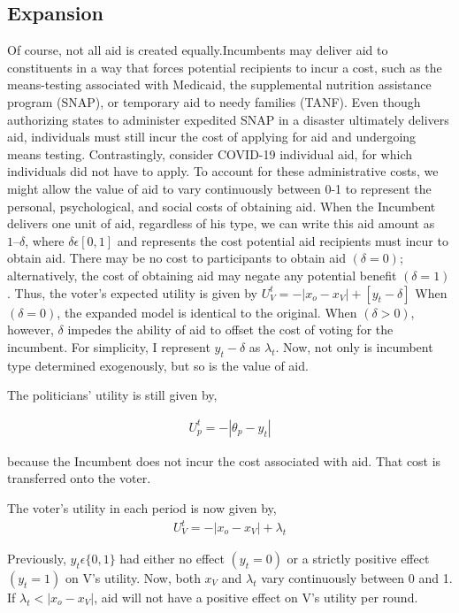 \documentclass[12pt]{paper}
\begin{document}
\subsection{Expansion}
Of course, not all aid is created equally.Incumbents may deliver aid to constituents in a way that forces potential recipients to incur a cost, such as the means-testing associated with Medicaid, the supplemental nutrition assistance program (SNAP), or temporary aid to needy families (TANF). Even though authorizing states to administer expedited SNAP in a disaster ultimately delivers aid, individuals must still incur the cost of applying for aid and undergoing means testing. Contrastingly, consider COVID-19 individual aid, for which individuals did not have to apply.
To account for these administrative costs, we might allow the value of aid to vary continuously between 0-1 to represent the personal, psychological, and social costs of obtaining aid. When the Incumbent delivers one unit of aid, regardless of his type, we can write this aid amount as $1 – \delta$, where $\delta \epsilon [0,1]$ and represents the cost potential aid recipients must incur to obtain aid. There may be no cost to participants to obtain aid $(\delta = 0)$; alternatively, the cost of obtaining aid may negate any potential benefit $(\delta = 1)$. Thus, the voter’s expected utility is given by $U_{V}^t = -|x_o - x_V| + [y_t - \delta]$ When $(\delta = 0)$, the expanded model is identical to the original. When $(\delta > 0)$, however, $\delta$ impedes the ability of aid to offset the cost of voting for the incumbent. For simplicity, I represent $y_t - \delta$ as  $\lambda_t$. Now, not only is incumbent type determined exogenously, but so is the value of aid.


The politicians’ utility is still given by,

\begin{gather}
U_{p}^t = -|\theta_p - y_t|
\end{gather}

because the Incumbent does not incur the cost associated with aid. That cost is transferred onto the voter.

The voter’s utility in each period is now given by, 
\begin{gather}
U_{V}^t = -|x_o - x_V| + \lambda_t
\end{gather}

Previously, $y_t \epsilon \{0,1\}$ had either no effect $(y_t = 0)$ or a strictly positive effect $(y_t = 1)$ on V's utility. Now, both $x_V$ and $\lambda_t$ vary continuously between 0 and 1. If $\lambda_t < |x_o - x_V|$, aid will not have a positive effect on V’s utility per round. 
\end{document}
